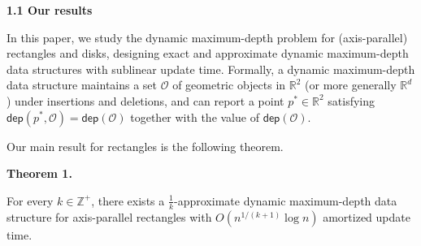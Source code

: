 \documentclass[10pt,a4paper]{article}
\begin{document}
\par
\par
\par\medskip\noindent\textbf{1.1 Our results}\par
In this paper, we study the dynamic maximum-depth problem for (axis-parallel) rectangles and disks, designing exact and approximate dynamic maximum-depth data structures with sublinear update time. Formally, a dynamic maximum-depth data structure maintains a set $\mathcal{O}$ of geometric objects in $\mathbb{R}^{2}$ (or more generally $\mathbb{R}^{d}$) under insertions and deletions, and can report a point $p^{*}\in\mathbb{R}^{2}$ satisfying $\mathsf{dep}(p^{*},\mathcal{O})=\mathsf{dep}(\mathcal{O})$ together with the value of $\mathsf{dep}(\mathcal{O})$.
\par
\par
Our main result for rectangles is the following theorem.
\par
\par

\par\medskip\noindent\textbf{Theorem 1.}\par
For every $k\in\mathbb{Z}^{+}$, there exists a $\frac{1}{k}$-approximate dynamic maximum-depth data structure for axis-parallel rectangles with $O(n^{1/(k+1)}\log n)$ amortized update time.
\par
\par
\par
\end{document}
